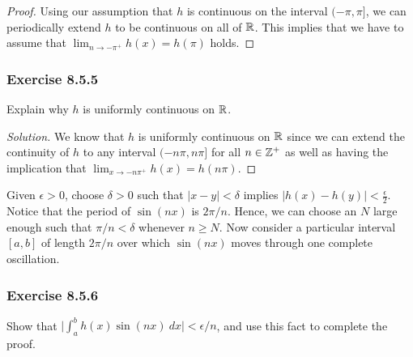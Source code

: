 \begin{proof}
    Using our assumption that \( h  \) is continuous on the interval \( (- \pi , \pi]  \), we can periodically extend \( h  \) to be continuous on all of \( \mathbb{R}  \). This implies that we have to assume that \( \lim_{ n \to - \pi ^{+} } h(x) = h(\pi) \) holds.
\end{proof}

\subsubsection{Exercise 8.5.5} Explain why \( h  \) is uniformly continuous on \( \mathbb{R}  \).
\begin{proof}[Solution]
    We know that \( h  \) is uniformly continuous on \( \mathbb{R}  \) since we can extend the continuity of \( h  \) to any interval \( (-n\pi, n\pi]   \) for all \( n\in \mathbb{Z}^{+} \) as well as having the implication that \( \lim_{ x \to - n \pi^{+} } h(x) = h(n\pi) \).
\end{proof}

Given \( \epsilon > 0 \), choose \( \delta > 0  \) such that \( | x - y  | < \delta  \) implies \( | h(x) - h(y) | < \frac{ \epsilon }{ 2 }  \). Notice that the period of \( \sin(nx) \) is \( 2 \pi / n  \). Hence, we can choose an \( N  \) large enough such that \( \pi / n < \delta  \) whenever \( n \geq N  \). Now
consider a particular interval \( [a,b]  \) of length \( 2 \pi / n  \) over which \( \sin(nx) \) moves through one complete oscillation.

\subsubsection{Exercise 8.5.6} Show that \( \Big| \int_{ a }^{ b } h(x) \sin(nx) \ dx  \Big| < \epsilon / n  \), and use this fact to complete the proof.

